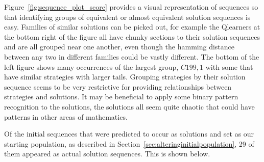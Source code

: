 Figure~\ref{fig:sequence_plot_score} provides a visual representation of sequences so that identifying groups of equivalent or almost equivalent solution sequences is easy.
Families of similar solutions can be picked out, for example the Qlearners at the bottom right of the figure all have chunky sections to their solution sequences and are all grouped near one another, even though the hamming distance between any two in different families could be vastly different.
The bottom of the left figure shows many occurrences of the largest group, $C199,1$ with some that have similar strategies with larger tails.
Grouping strategies by their solution sequence seems to be very restrictive for providing relationships between strategies and solutions. 
It may be beneficial to apply some binary pattern recognition to the solutions, the solutions all seem quite chaotic that could have patterns in other areas of mathematics.

Of the initial sequences that were predicted to occur as solutions and set as our starting population, as described in Section~\ref{sec:alteringinitialpopulation}, 29 of them appeared as actual solution sequences. 
This is shown below.

